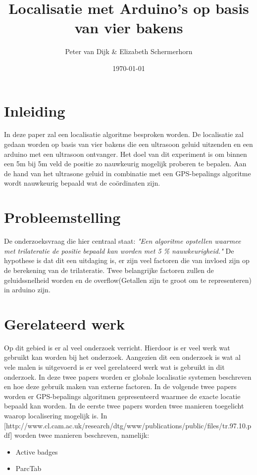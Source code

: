\documentclass{article}
\author{Peter van Dijk \& Elizabeth Schermerhorn}
\date{\today}
\title{Localisatie met Arduino's op basis van vier bakens}
\begin{document}
\maketitle
\newpage
\tableofcontents
\clearpage
\section{Inleiding}
In deze paper zal een localisatie algoritme besproken worden. De localisatie zal gedaan worden op basis van vier bakens die een ultrasoon geluid uitzenden en een arduino met een ultrasoon ontvanger. Het doel van dit experiment is om binnen een 5m bij 5m veld de positie zo nauwkeurig mogelijk proberen te bepalen. Aan de hand van het ultrasone geluid in combinatie met een GPS-bepalings algoritme wordt nauwkeurig bepaald wat de co\"{o}rdinaten zijn. 


\section{Probleemstelling}
De onderzoeksvraag die hier centraal staat: \textit{"Een algoritme opstellen waarmee met trilateratie de positie bepaald kan worden met 5 \% nauwkeurigheid."}
De hypothese is dat dit een uitdaging is, er zijn veel factoren die van invloed zijn op de berekening van de trilateratie. Twee belangrijke factoren zullen de geluidssnelheid worden en de overflow(Getallen zijn te groot om te representeren) in arduino zijn. 

\section{Gerelateerd werk}
Op dit gebied is er al veel onderzoek verricht. Hierdoor is er veel werk wat gebruikt kan worden bij het onderzoek. Aangezien dit een onderzoek is wat al vele malen is uitgevoerd is er veel gerelateerd werk wat is gebruikt in dit onderzoek. In deze twee papers worden er globale localisatie systemen beschreven en hoe deze gebruik maken van externe factoren. In de volgende twee papers worden er GPS-bepalings algoritmen gepresenteerd waarmee de exacte locatie bepaald kan worden. In de eerste twee papers worden twee manieren toegelicht waarop localisering mogelijk is. In [http://www.cl.cam.ac.uk/research/dtg/www/publications/public/files/tr.97.10.pdf] worden twee manieren beschreven, namelijk:
\begin{itemize}
	\item Active badges
	\item ParcTab
\end{itemize}
\end{document}
